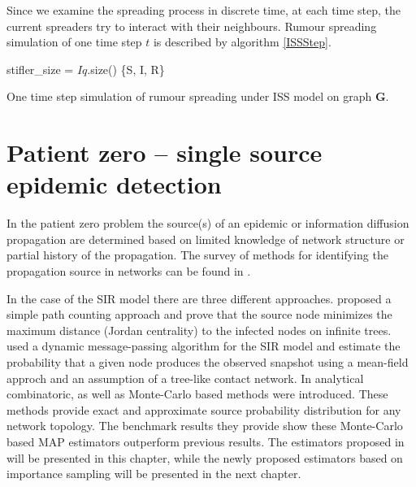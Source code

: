 \documentclass[times, utf8, diplomski]{fer}
\begin{document}
Since we examine the spreading process in discrete time, at each time step, the current spreaders try to interact with their neighbours. Rumour spreading simulation of one time step $t$ is described by algorithm \ref{ISSStep}.

\vspace{10mm}

\begin{algorithm}[H]
 stifler\_size = $Iq$.size()\;
  \Return \{S, I, R\}
 \label{ISSStep}
 \caption{One time step simulation of rumour spreading under ISS model on graph $\mathbf{G}$.}
\end{algorithm}

\chapter{Patient zero -- single source epidemic detection}
In the patient zero problem the source(s) of an epidemic or information diffusion propagation are determined based on limited knowledge of network structure or partial history of the propagation. The survey of methods for identifying the propagation source in networks can be found in \cite{soa_source}.

In the case of the SIR model there are three different approaches. \cite{Zhu} proposed a simple path counting approach and prove that the source node minimizes the maximum distance (Jordan centrality) to the infected nodes on infinite trees. \cite{Lohkov} used a dynamic message-passing algorithm for the SIR model and estimate the probability that a given node produces the observed snapshot using a mean-field approch and an assumption of a tree-like contact network. In \cite{Nino} analytical combinatoric, as well as Monte-Carlo based methods were introduced. These methods provide exact and approximate source probability distribution for any network topology. The benchmark results they provide show these Monte-Carlo based MAP estimators outperform previous results. The estimators proposed in \cite{Nino} will be presented in this chapter, while the newly proposed estimators based on importance sampling will be presented in the next chapter.
\end{document}
